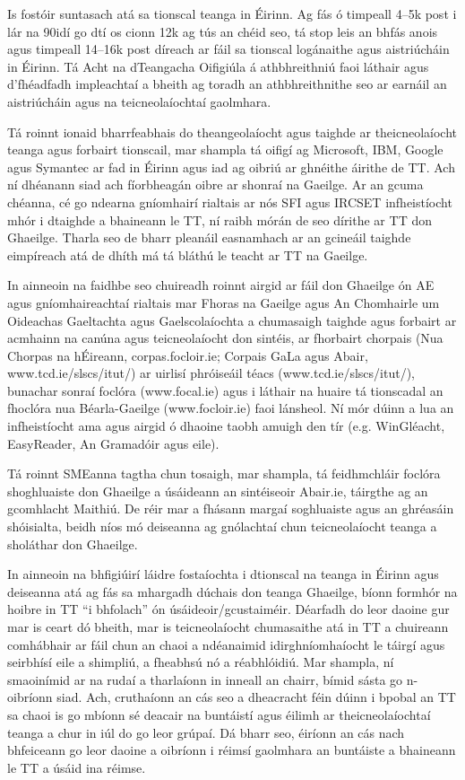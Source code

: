 \begin{multicols}{2}
Is fostóir suntasach atá sa tionscal teanga in Éirinn. Ag fás ó timpeall 4--5k post i lár na 90idí go dtí os cionn 12k ag tús an chéid seo, tá stop leis an bhfás anois agus timpeall 14--16k post díreach ar fáil sa tionscal logánaithe agus aistriúcháin in Éirinn. Tá Acht na dTeangacha Oifigiúla á athbhreithniú faoi láthair agus d'fhéadfadh impleachtaí a bheith ag toradh an athbhreithnithe seo ar earnáil an aistriúcháin agus na teicneolaíochtaí gaolmhara.

Tá roinnt ionaid bharrfeabhais do theangeolaíocht agus taighde ar theicneolaíocht teanga agus forbairt tionscail, mar shampla tá oifigí ag Microsoft, IBM, Google agus Symantec ar fad in Éirinn agus iad ag oibriú ar ghnéithe áirithe de TT. Ach ní dhéanann siad ach fíorbheagán oibre ar shonraí na Gaeilge. Ar an gcuma chéanna, cé go ndearna gníomhairí rialtais ar nós SFI agus IRCSET infheistíocht mhór i dtaighde a bhaineann le TT, ní raibh mórán de seo dírithe ar TT don Ghaeilge. Tharla seo de bharr pleanáil easnamhach ar an gcineáil taighde eimpíreach atá de dhíth má tá bláthú le teacht ar TT na Gaeilge.

In ainneoin na faidhbe seo chuireadh roinnt airgid ar fáil don Ghaeilge ón AE agus gníomhaireachtaí rialtais mar Fhoras na Gaeilge agus An Chomhairle um Oideachas Gaeltachta agus Gaelscolaíochta a chumasaigh taighde agus forbairt ar acmhainn na canúna agus teicneolaíocht don sintéis,  ar fhorbairt chorpais (Nua Chorpas na hÉireann, corpas.focloir.ie; Corpais GaLa agus Abair, www.tcd.ie/slscs/itut/) ar uirlisí phróiseáil téacs (www.tcd.ie/slscs/itut/), bunachar sonraí foclóra (www.focal.ie) agus i láthair na huaire tá tionscadal an fhoclóra nua Béarla-Gaeilge (www.focloir.ie)  faoi lánsheol. Ní mór dúinn a lua an infheistíocht ama agus airgid ó dhaoine  taobh amuigh den tír (e.g. WinGléacht, EasyReader, An Gramadóir agus eile).

Tá roinnt SMEanna tagtha chun tosaigh, mar shampla, tá feidhmchláir foclóra shoghluaiste don Ghaeilge a úsáideann an sintéiseoir Abair.ie, táirgthe ag an gcomhlacht Maithiú. De réir mar a fhásann margaí soghluaiste agus an ghréasáin shóisialta, beidh níos mó deiseanna ag gnólachtaí chun teicneolaíocht teanga a sholáthar don Ghaeilge.

In ainneoin na bhfigiúirí láidre fostaíochta i dtionscal na teanga in Éirinn agus deiseanna atá ag fás sa mhargadh dúchais don teanga Ghaeilge, bíonn formhór na hoibre in TT ``i bhfolach'' ón úsáideoir/gcustaiméir. Déarfadh do leor daoine gur mar is ceart dó bheith, mar is teicneolaíocht chumasaithe atá in TT a chuireann comhábhair ar fáil chun an chaoi a ndéanaimid idirghníomhaíocht le táirgí agus seirbhísí eile a shimpliú, a fheabhsú nó a réabhlóidiú. Mar shampla, ní smaoinímid ar na rudaí a tharlaíonn in inneall an chairr, bímid sásta go n-oibríonn siad. Ach, cruthaíonn an cás seo a dheacracht féin dúinn i bpobal an TT sa chaoi is go mbíonn sé deacair na buntáistí agus éilimh ar theicneolaíochtaí teanga a chur in iúl do go leor grúpaí. Dá bharr seo, éiríonn an cás nach bhfeiceann go leor daoine a oibríonn i réimsí gaolmhara an buntáiste a bhaineann le TT a úsáid ina réimse. 


\end{multicols}
